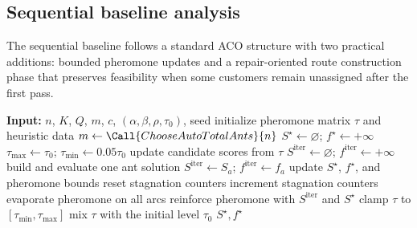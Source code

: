 \subsection{Sequential baseline analysis}

The sequential baseline follows a standard ACO structure with two practical additions: bounded pheromone updates and a repair-oriented route construction phase that preserves feasibility when some customers remain unassigned after the first pass.

\begin{algorithm}[H]
\caption{Sequential ACO baseline}
\footnotesize
\begin{algorithmic}[1]
\State \textbf{Input:} $n$, $K$, $Q$, $m$, $c$, $(\alpha,\beta,\rho,\tau_0)$, seed
\State initialize pheromone matrix $\tau$ and heuristic data
    \State $m \leftarrow \Call{ChooseAutoTotalAnts}{n}$
\EndIf
\State $S^{\star} \leftarrow \varnothing$; $f^{\star} \leftarrow +\infty$
\State $\tau_{\max} \leftarrow \tau_0$; $\tau_{\min} \leftarrow 0.05\tau_0$
    \State update candidate scores from $\tau$
    \State $S^{\mathrm{iter}} \leftarrow \varnothing$; $f^{\mathrm{iter}} \leftarrow +\infty$
        \State build and evaluate one ant solution
            \State $S^{\mathrm{iter}} \leftarrow S_a$; $f^{\mathrm{iter}} \leftarrow f_a$
        \EndIf
    \EndFor
        \State update $S^{\star}$, $f^{\star}$, and pheromone bounds
        \State reset stagnation counters
    \Else
        \State increment stagnation counters
    \EndIf
    \State evaporate pheromone on all arcs
    \State reinforce pheromone with $S^{\mathrm{iter}}$ and $S^{\star}$
    \State clamp $\tau$ to $[\tau_{\min},\tau_{\max}]$
        \State mix $\tau$ with the initial level $\tau_0$
    \EndIf
\EndFor
\State \Return $S^{\star}, f^{\star}$
\end{algorithmic}
\normalsize
\end{algorithm}

